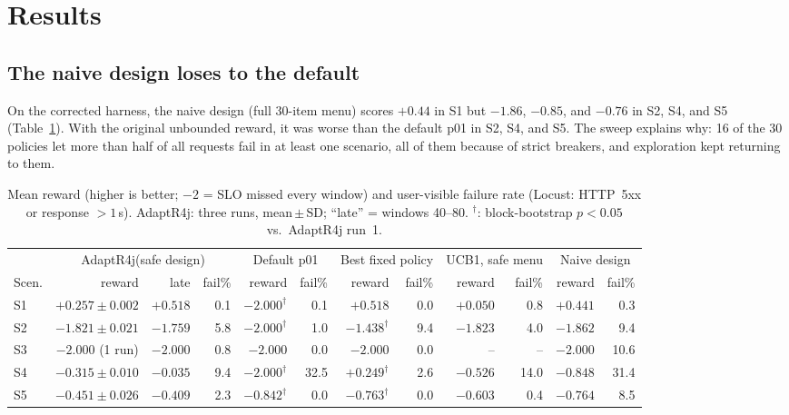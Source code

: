 \documentclass[journal]{IEEEtran}
\newcommand{\adaptr}{AdaptR4j\xspace}
\begin{document}
\section{Results}
\label{sec:results}

\subsection{The naive design loses to the default}
\label{sec:naive}

On the corrected harness, the naive design (full 30-item menu) scores $+0.44$ in S1 but
$-1.86$, $-0.85$, and $-0.76$ in S2, S4, and S5 (Table~\ref{tab:main}). With the original
unbounded reward, it was worse than the default p01 in S2, S4, and S5. The sweep explains why:
16 of the 30 policies let more than half of all requests fail in at least one scenario, all of
them because of strict breakers, and exploration kept returning to them.

\begin{table}[t]
\centering
\small
\caption{Mean reward (higher is better; $-2$ = SLO missed every window) and user-visible failure
  rate (Locust: HTTP~5xx or response $>1$\,s). \adaptr: three runs, mean\,$\pm$\,SD; ``late'' =
  windows 40--80. $^\dagger$: block-bootstrap $p<0.05$ vs.\ \adaptr run~1.}
\label{tab:main}
\begin{tabular}{l rrr rr rr rr rr}
\toprule
 & \multicolumn{3}{c}{\adaptr (safe design)} & \multicolumn{2}{c}{Default p01}
 & \multicolumn{2}{c}{Best fixed policy} & \multicolumn{2}{c}{UCB1, safe menu}
 & \multicolumn{2}{c}{Naive design} \\
\cmidrule(lr){2-4}\cmidrule(lr){5-6}\cmidrule(lr){7-8}\cmidrule(lr){9-10}\cmidrule(lr){11-12}
Scen. & reward & late & fail\% & reward & fail\% & reward & fail\% & reward & fail\% & reward & fail\% \\
\midrule
S1 & $+0.257 \pm 0.002$ & $+0.518$ & 0.1 & $-2.000^\dagger$ & 0.1 & $+0.518$ & 0.0 & $+0.050$ & 0.8 & $+0.441$ & 0.3 \\
S2 & $-1.821 \pm 0.021$ & $-1.759$ & 5.8 & $-2.000^\dagger$ & 1.0 & $-1.438^\dagger$ & 9.4 & $-1.823$ & 4.0 & $-1.862$ & 9.4 \\
S3 & $-2.000$ (1 run)   & $-2.000$ & 0.8 & $-2.000$ & 0.0 & $-2.000$ & 0.0 & -- & -- & $-2.000$ & 10.6 \\
S4 & $-0.315 \pm 0.010$ & $-0.035$ & 9.4 & $-2.000^\dagger$ & 32.5 & $+0.249^\dagger$ & 2.6 & $-0.526$ & 14.0 & $-0.848$ & 31.4 \\
S5 & $-0.451 \pm 0.026$ & $-0.409$ & 2.3 & $-0.842^\dagger$ & 0.0 & $-0.763^\dagger$ & 0.0 & $-0.603$ & 0.4 & $-0.764$ & 8.5 \\
\bottomrule
\end{tabular}
\end{table}
\end{document}
